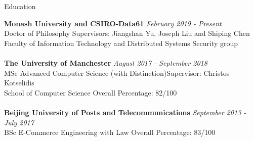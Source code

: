 \documentclass{resume} %
\begin{document}

\begin{rSection}{Education}

    {\bf Monash University and CSIRO-Data61} \hfill {\em February 2019 - Present}
    \\ Doctor of Philosophy\hfill { Supervisors: Jiangshan Yu, Joseph Liu and Shiping Chen}
    \\ Faculty of Information Technology and Distributed Systems Security group\\
    \\{\bf The University of Manchester} \hfill {\em August 2017 - September 2018}
    \\ MSc Advanced Computer Science (with Distinction)\hfill {Supervisor: Christos Kotselidis}
    \\ School of Computer Science\hfill { Overall Percentage: 82/100 }\\
    \\{\bf Beijing University of Posts and Telecommunications} \hfill {\em September 2013 - July 2017}
    \\ BSc E-Commerce Engineering with Law\hfill { Overall Percentage: 83/100 }


\end{rSection}
\end{document}
